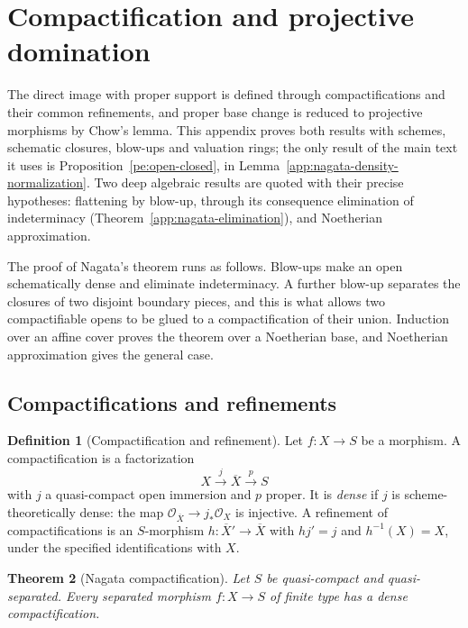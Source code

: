 \documentclass[11pt,a4paper]{article}
\numberwithin{equation}{section}
\newtheorem{theorem}{Theorem}[section]
\theoremstyle{definition}
\newtheorem{definition}[theorem]{Definition}
\theoremstyle{remark}
\begin{document}
\section{Compactification and projective domination}
\label{app:compactification}

The direct image with proper support is defined through
compactifications and their common refinements, and proper base change
is reduced to projective morphisms by Chow's lemma. This appendix proves
both results with schemes, schematic closures, blow-ups and valuation
rings; the only result of the main text it uses is
Proposition~\ref{pe:open-closed}, in
Lemma~\ref{app:nagata-density-normalization}. Two deep algebraic results
are quoted with their precise hypotheses: flattening by blow-up, through
its consequence elimination of indeterminacy
(Theorem~\ref{app:nagata-elimination}), and Noetherian approximation.

The proof of Nagata's theorem runs as follows. Blow-ups make an open
schematically dense and eliminate indeterminacy. A further blow-up
separates the closures of two disjoint boundary pieces, and this is
what allows two compactifiable opens to be glued to a compactification
of their union. Induction over an affine cover proves the theorem over
a Noetherian base, and Noetherian approximation gives the general case.

\subsection{Compactifications and refinements}

\begin{definition}[Compactification and refinement]
\label{app:nagata-definition}
Let $f:X\to S$ be a morphism. A compactification is a factorization
\[
 X\xrightarrow{j}\overline X\xrightarrow{p}S
\]
with $j$ a quasi-compact open immersion and $p$ proper. It is
\emph{dense} if $j$ is scheme-theoretically dense: the map
$\mathcal O_{\overline X}\to j_*\mathcal O_X$ is injective.
A refinement of compactifications is an $S$-morphism
$h:\overline X'\to\overline X$ with $hj'=j$ and
$h^{-1}(X)=X$, under the specified identifications with $X$.
\end{definition}

\begin{theorem}[Nagata compactification]
\label{app:nagata-theorem}
Let $S$ be quasi-compact and quasi-separated. Every separated morphism
$f:X\to S$ of finite type has a dense compactification.
\end{theorem}
\end{document}
